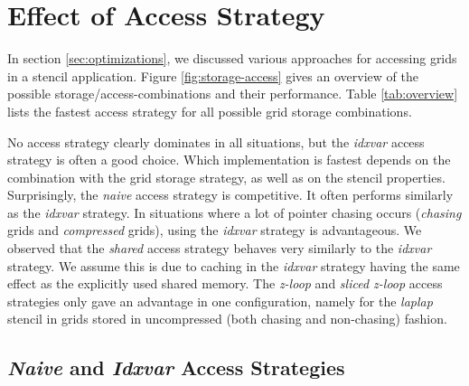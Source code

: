 \section{Effect of Access Strategy} \label{sec:res-access}

In section \ref{sec:optimizations}, we discussed various approaches for accessing grids in a stencil application. Figure \ref{fig:storage-access} gives an overview of the possible storage/access-combinations and their performance. Table \ref{tab:overview} lists the fastest access strategy for all possible grid storage combinations.

No access strategy clearly dominates in all situations, but the \emph{idxvar} access strategy is often a good choice. Which implementation is fastest depends on the combination with the grid storage strategy, as well as on the stencil properties. Surprisingly, the \emph{naive} access strategy is competitive. It often performs similarly as the \emph{idxvar} strategy. In situations where a lot of pointer chasing occurs (\emph{chasing} grids and \emph{compressed} grids), using the \emph{idxvar} strategy is advantageous. We observed that the \emph{shared} access strategy behaves very similarly to the \emph{idxvar} strategy. We assume this is due to caching in the \emph{idxvar} strategy having the same effect as the explicitly used shared memory. The \emph{z-loop} and \emph{sliced z-loop} access strategies only gave an advantage in one configuration, namely for the \emph{laplap} stencil in grids stored in uncompressed (both chasing and non-chasing) fashion.


\subsection{\emph{Naive} and \emph{Idxvar} Access Strategies}

